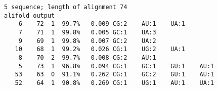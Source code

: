 \documentclass[]{article}
\begin{document}
  \begin{center}
    \begin{verbatim} 
5 sequence; length of alignment 74
alifold output
    6    72  1  99.7%   0.009 CG:2    AU:1    UA:1
    7    71  1  99.8%   0.005 GC:1    UA:3
    9    69  1  99.8%   0.007 GC:2    UA:2
   10    68  1  99.2%   0.026 CG:1    UG:2    UA:1
    8    70  2  99.7%   0.008 CG:2    AU:1
    5    73  1  96.8%   0.094 CG:1    GC:1    GU:1    AU:1
   53    63  0  91.1%   0.262 CG:1    GC:2    GU:1    AU:1
   52    64  1  90.8%   0.269 CG:1    UG:1    AU:1    UA:1
    \end{verbatim}
  \end{center}
\end{document}
